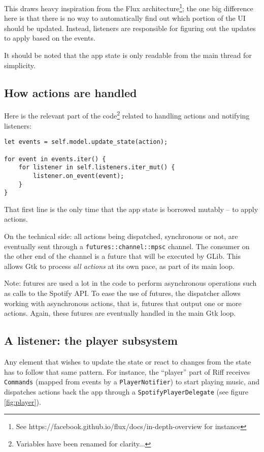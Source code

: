 \documentclass[12pt, a4paper]{article}
\begin{document}
This draws heavy inspiration from the Flux architecture\footnote{See https://facebook.github.io/flux/docs/in-depth-overview for instance}; the one big difference here is that there is no way to automatically find out which portion of the UI should be updated. Instead, listeners are responsible for figuring out the updates to apply based on the events.

It should be noted that the app state is only readable from the main thread for simplicity.

\subsection{How actions are handled}

Here is the relevant part of the code\footnote{Variables have been renamed for clarity...} related to handling actions and notifying listeners:

\begin{verbatim}
let events = self.model.update_state(action);

for event in events.iter() {
    for listener in self.listeners.iter_mut() {
        listener.on_event(event);
    }
}
\end{verbatim}

That first line is the only time that the app state is borrowed mutably -- to apply actions.

On the technical side: all actions being dispatched, synchronous or not, are eventually sent through a \texttt{futures::channel::mpsc} channel. The consumer on the other end of the channel is a future that will be executed by GLib. This allows Gtk to process \emph{all actions} at its own pace, as part of its main loop.

Note: futures are used a lot in the code to perform asynchronous operations such as calls to the Spotify API. To ease the use of futures, the dispatcher allows working with asynchronous actions, that is, futures that output one or more actions. Again, these futures are eventually handled in the main Gtk loop.

\subsection{A listener: the player subsystem}

Any element that wishes to update the state or react to changes from the state has to follow that same pattern. For instance, the ``player'' part of Riff receives \texttt{Commands} (mapped from events by a \texttt{PlayerNotifier}) to start playing music, and dispatches actions back the app through a \texttt{SpotifyPlayerDelegate} (see figure \ref{fig:player}).
\end{document}
